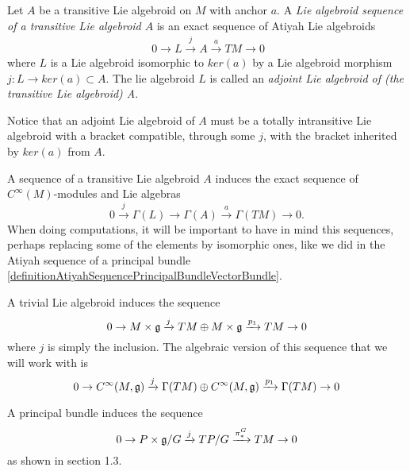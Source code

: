 \begin{definition}\label{definitionTransitiveLieAlgebroidSequenceLiealgebroidsequenceofatransitiveliealgebroidA}
Let $A$ be a transitive Lie algebroid on $M$ with anchor $a$. A \emph{Lie algebroid sequence of a transitive Lie algebroid $A$} is an exact sequence of Atiyah Lie algebroids
\begin{align}\
    0 \to L \xrightarrow{j} A \xrightarrow{a} TM \to 0
\end{align}
where $L$ is a Lie algebroid isomorphic to $ker(a)$ by a Lie algebroid morphism $j:L \to ker(a) \subset A$. The lie algebroid $L$ is called an \emph{adjoint Lie algebroid of (the transitive Lie algebroid) A}.
\end{definition}
Notice that an adjoint Lie algebroid of $A$ must be a totally intransitive Lie algebroid with a bracket compatible, through some $j$, with the bracket inherited by $ker(a)$ from $A$.

\begin{remark}
A sequence of a transitive Lie algebroid $A$ induces the exact sequence of $C^\infty(M)$-modules and Lie algebras
\begin{equation}
    \label{moduleTransitiveSequence}
    0 \xrightarrow{j} \Gamma(L) \to  \Gamma(A) \xrightarrow{a} \Gamma(TM) \to 0.
\end{equation}
 When doing computations, it will be important to have in mind this sequences, perhaps replacing some of the elements by isomorphic ones, like we did in the Atiyah sequence of a principal bundle \ref{definitionAtiyahSequencePrincipalBundleVectorBundle}.
\end{remark}

\begin{example}
A trivial Lie algebroid induces the sequence
\begin{equation}
     0 \to M \times \mathfrak{g} \xrightarrow{j} TM \oplus M \times \mathfrak{g}  \xrightarrow{p_1} TM \to 0
\end{equation}
where $j$ is simply the inclusion. The algebraic version of this sequence that we will work with is
\begin{equation}\label{equationALgebraicSectionAtiyahSequenceTrivialLieAlgebroid}
     0 \to C^\infty(M, \mathfrak{g}) \xrightarrow{j} \Gamma(TM) \oplus C^\infty(M, \mathfrak{g})  \xrightarrow{p_1} \Gamma(TM) \to 0
\end{equation}
\end{example}

\begin{example}
A principal bundle induces the sequence
\begin{equation}
    0 \to P \times \mathfrak{g}/G \xrightarrow{j} TP/G \xrightarrow{\pi_*^G} TM \to 0
\end{equation}
as shown in section 1.3.
\end{example}

